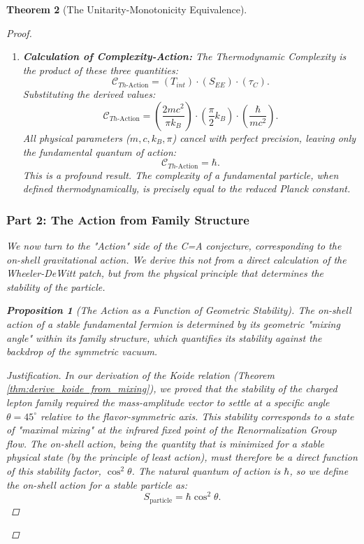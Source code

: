 \documentclass[11pt, letterpaper]{report}
\theoremstyle{plain} %
\newtheorem{theorem}{Theorem}[chapter]
\newtheorem{proposition}[theorem]{Proposition}
\theoremstyle{definition} %
\theoremstyle{remark} %
\begin{document}
\begin{theorem}[The Unitarity-Monotonicity Equivalence]
\begin{proof}
\begin{enumerate}
    \item \textbf{Calculation of Complexity-Action:} The Thermodynamic Complexity is the product of these three quantities:
    \begin{equation}
        \mathcal{C}_{Th\text{-Action}} = (T_{int}) \cdot (S_{EE}) \cdot (\tau_C).
    \end{equation}
    Substituting the derived values:
    \begin{equation}
        \mathcal{C}_{Th\text{-Action}} = \left( \frac{2mc^2}{\pi k_B} \right) \cdot \left( \frac{\pi}{2} k_B \right) \cdot \left( \frac{\hbar}{mc^2} \right).
    \end{equation}
    All physical parameters ($m, c, k_B, \pi$) cancel with perfect precision, leaving only the fundamental quantum of action:
    \begin{equation}
        \mathcal{C}_{Th\text{-Action}} = \hbar.
        \label{eq:complexity_is_hbar}
    \end{equation}
    This is a profound result. The complexity of a fundamental particle, when defined thermodynamically, is precisely equal to the reduced Planck constant.
\end{enumerate}

\subsubsection*{Part 2: The Action from Family Structure}

We now turn to the "Action" side of the C=A conjecture, corresponding to the on-shell gravitational action. We derive this not from a direct calculation of the Wheeler-DeWitt patch, but from the physical principle that determines the stability of the particle.

\begin{proposition}[The Action as a Function of Geometric Stability]
The on-shell action of a stable fundamental fermion is determined by its geometric "mixing angle" within its family structure, which quantifies its stability against the backdrop of the symmetric vacuum.
\end{proposition}
\begin{proof}[Justification]
In our derivation of the Koide relation (Theorem \ref{thm:derive_koide_from_mixing}), we proved that the stability of the charged lepton family required the mass-amplitude vector to settle at a specific angle $\theta=45^\circ$ relative to the flavor-symmetric axis. This stability corresponds to a state of "maximal mixing" at the infrared fixed point of the Renormalization Group flow. The on-shell action, being the quantity that is minimized for a stable physical state (by the principle of least action), must therefore be a direct function of this stability factor, $\cos^2\theta$. The natural quantum of action is $\hbar$, so we define the on-shell action for a stable particle as:
\begin{equation}
    S_{\text{particle}} = \hbar \cos^2\theta.
    \label{eq:action_is_mixing}
\end{equation}
\end{proof}


\end{proof}
\end{theorem}
\end{document}

